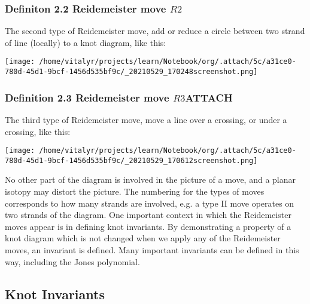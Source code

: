 \documentclass[lang=cn]{elegantpaper}
\begin{document}
\subsubsection{Definiton 2.2 Reidemeister move \(R2\)}
\label{sec:org638952b}
The second type of Reidemeister move, add or reduce a circle between two strand of line (locally) to a knot diagram, like this:
\begin{center}
\texttt{[image: /home/vitalyr/projects/learn/Notebook/org/.attach/5c/a31ce0-780d-45d1-9bcf-1456d535bf9c/\_20210529\_170248screenshot.png]}
\end{center}

\subsubsection{Definition 2.3 Reidemeister move \(R3\)\hfill{}\textsc{ATTACH}}
\label{sec:org35db08c}
The third type of Reidemeister move, move a  line over a crossing, or under a crossing, like this:
\begin{center}
\texttt{[image: /home/vitalyr/projects/learn/Notebook/org/.attach/5c/a31ce0-780d-45d1-9bcf-1456d535bf9c/\_20210529\_170612screenshot.png]}
\end{center}

No other part of the diagram is involved in the picture of a move, and a planar isotopy may distort the picture. The numbering for the types of moves corresponds to how many strands are involved, e.g. a type II move operates on two strands of the diagram.
One important context in which the Reidemeister moves appear is in defining knot invariants. By demonstrating a property of a knot diagram which is not changed when we apply any of the Reidemeister moves, an invariant is defined. Many important invariants can be defined in this way, including the Jones polynomial.
\subsection{Knot Invariants}
\label{sec:org3a7c8f2}
\end{document}
